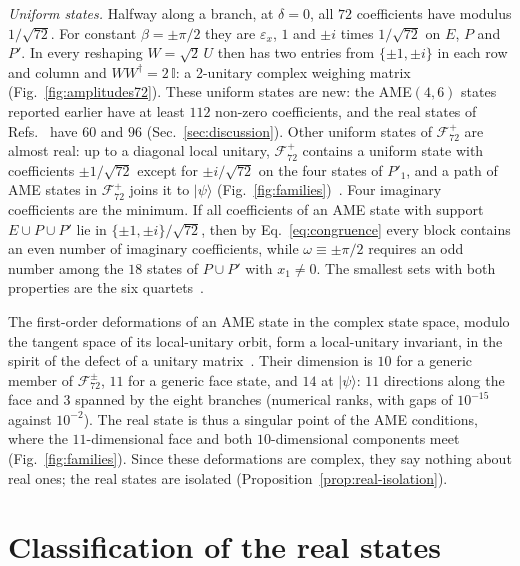\documentclass[aps,pra,reprint,superscriptaddress,amsmath,amssymb,longbibliography]{revtex4-2}
\newcommand{\ket}[1]{\lvert #1\rangle}
\theoremstyle{plain}
\begin{document}
\emph{Uniform states.}  Halfway along a branch, at $\delta=0$, all $72$ coefficients have modulus $1/\sqrt{72}$.  For
constant $\beta=\pm\pi/2$ they are $\varepsilon_x$, $1$ and $\pm i$ times $1/\sqrt{72}$ on $E$, $P$ and $P'$.  In every
reshaping $W=\sqrt2\,U$ then has two entries from $\{\pm1,\pm i\}$ in each row and column and $WW^\dagger=2\,\mathbb I$:
a 2-unitary complex weighing matrix (Fig.~\ref{fig:amplitudes72}).  These uniform states are new: the AME$(4,6)$
states reported earlier have at least $112$ non-zero coefficients, and the real states of Refs.~\cite{Bru26,HZ26} have
$60$ and $96$ (Sec.~\ref{sec:discussion}).  Other uniform states of
$\mathcal F_{72}^+$ are almost real: up to a diagonal local unitary, $\mathcal F_{72}^+$ contains a uniform state with
coefficients $\pm1/\sqrt{72}$ except for $\pm i/\sqrt{72}$ on the four states of $P'_1$, and a path of AME states in
$\mathcal F_{72}^+$ joins it to $\ket\psi$ (Fig.~\ref{fig:families})~\cite{repo}.  Four imaginary coefficients are the
minimum.  If all coefficients of an AME state with support $E\cup P\cup P'$ lie in $\{\pm1,\pm i\}/\sqrt{72}$, then by
Eq.~\eqref{eq:congruence} every block contains an even number of imaginary coefficients, while $\omega\equiv\pm\pi/2$
requires an odd number among the $18$ states of $P\cup P'$ with $x_1\neq0$.  The smallest sets with both properties are
the six quartets~\cite{repo}.

The first-order deformations of an AME state in the complex state space, modulo the tangent space of its local-unitary orbit, form a
local-unitary invariant, in the spirit of the defect of a unitary matrix~\cite{TZ2008}.  Their dimension is $10$ for a generic member of $\mathcal F_{72}^\pm$, $11$ for a generic face
state, and $14$ at $\ket\psi$: $11$ directions along the face and $3$ spanned by the eight branches (numerical ranks,
with gaps of $10^{-15}$ against $10^{-2}$).  The real state is thus a singular point of the AME conditions, where the
$11$-dimensional face and both $10$-dimensional components meet (Fig.~\ref{fig:families}).
Since these deformations are complex, they say nothing about real ones; the real states are isolated
(Proposition~\ref{prop:real-isolation}).

\section{Classification of the real states}\label{sec:real}
\end{document}
